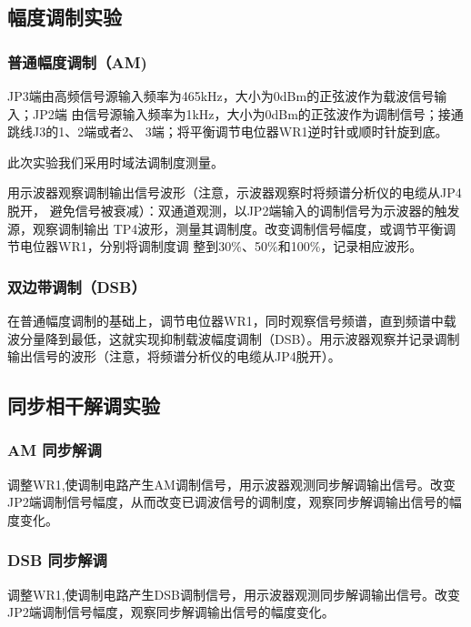 \documentclass{../source/Experiment}
\begin{document}
        \subsection{幅度调制实验}
            \subsubsection{普通幅度调制（AM)}
            JP3端由高频信号源输入频率为465kHz，大小为0dBm的正弦波作为载波信号输入；JP2端
            由信号源输入频率为1kHz，大小为0dBm的正弦波作为调制信号；接通跳线J3的1、2端或者2、
            3端；将平衡调节电位器WR1逆时针或顺时针旋到底。
            
            此次实验我们采用时域法调制度测量。

            用示波器观察调制输出信号波形（注意，示波器观察时将频谱分析仪的电缆从JP4脱开，
            避免信号被衰减）：双通道观测，以JP2端输入的调制信号为示波器的触发源，观察调制输出
            TP4波形，测量其调制度。改变调制信号幅度，或调节平衡调节电位器WR1，分别将调制度调
            整到30\%、50\%和100\%，记录相应波形。
            
            \subsubsection{双边带调制（DSB）}

            在普通幅度调制的基础上，调节电位器WR1，同时观察信号频谱，直到频谱中载波分量降到最低，这就实现抑制载波幅度调制（DSB）。用示波器观察并记录调制输出信号的波形（注意，将频谱分析仪的电缆从JP4脱开）。

        \subsection{同步相干解调实验}

        \subsubsection{AM 同步解调}

        调整WR1,使调制电路产生AM调制信号，用示波器观测同步解调输出信号。改变JP2端调制信号幅度，从而改变已调波信号的调制度，观察同步解调输出信号的幅度变化。

        \subsubsection{DSB 同步解调}
        
        调整WR1,使调制电路产生DSB调制信号，用示波器观测同步解调输出信号。改变JP2端调制信号幅度，观察同步解调输出信号的幅度变化。
\end{document}
